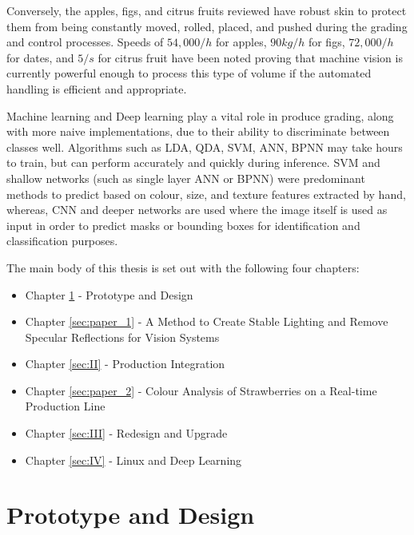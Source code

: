 \documentclass[fleqn,twoside]{article}
\begin{document}
Conversely, the apples, figs, and citrus fruits reviewed have robust skin to protect them from being constantly moved, rolled, placed, and pushed during the grading and control processes. Speeds of $54,000/h$ for apples, $90kg/h$ for figs, $72,000/h$ for dates, and $5/s$ for citrus fruit have been noted proving that machine vision is currently powerful enough to process this type of volume if the automated handling is efficient and appropriate.

Machine learning and Deep learning play a vital role in produce grading, along with more naive implementations, due to their ability to discriminate between classes well. Algorithms such as LDA, QDA, SVM, ANN, BPNN may take hours to train, but can perform accurately and quickly during inference. SVM and shallow networks (such as single layer ANN or BPNN) were predominant methods to predict based on colour, size, and texture features extracted by hand, whereas, CNN and deeper networks are used where the image itself is used as input in order to predict masks or bounding boxes for identification and classification purposes.

\quad
\quad


The main body of this thesis is set out with the following four chapters: 


\begin{itemize}
	\item Chapter \ref{sec:I} - Prototype and Design
	\item Chapter \ref{sec:paper_1} - A Method to Create Stable Lighting and Remove Specular Reflections for Vision Systems
	\item Chapter \ref{sec:II} - Production Integration 
	\item Chapter \ref{sec:paper_2} - Colour Analysis of Strawberries on a Real-time Production Line
	\item Chapter \ref{sec:III} - Redesign and Upgrade
	\item Chapter \ref{sec:IV} - Linux and Deep Learning 
\end{itemize}


 


\newpage

\section{Prototype and Design}
\label{sec:I}
\end{document}
